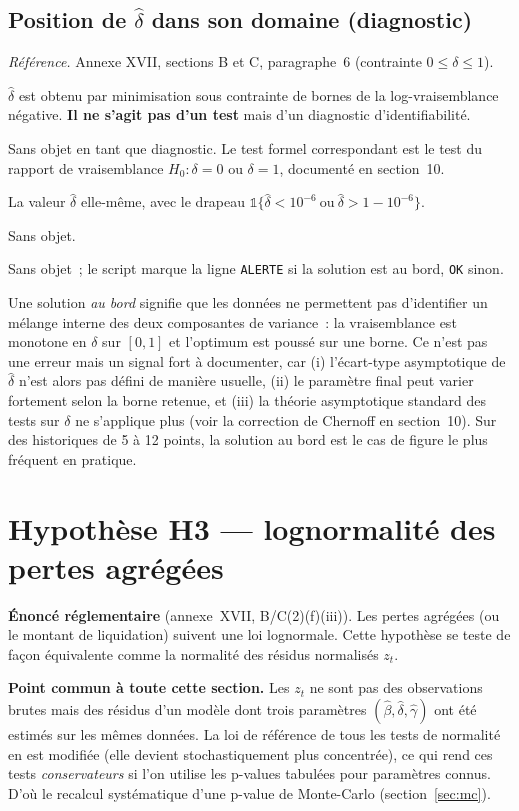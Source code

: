 \documentclass[a4paper,11pt]{article}
\newcommand{\code}[1]{\texttt{\small #1}}
\newcommand{\refl}[1]{{\small\textcolor{maincolor!70!black}{\textit{Référence.} #1}}\par\smallskip}
\newcounter{ficheid}
\newenvironment{fiche}[1]{%
  \stepcounter{ficheid}%
  \phantomsection
  \subsection{#1}%
  \label{fiche:\theficheid}%
}{%
  \end{description}\vspace{0.5em}%
}
\newcommand{\Cadre}{%
  \begin{description}[leftmargin=0pt, style=unboxed, itemsep=3pt, topsep=3pt, parsep=2pt]%
  \item[\textcolor{financeblue}{\textbf{1. Cadre, notations et hypothèses de validité (non testées).}}]}
\newcommand{\Hzero}{\item[\textcolor{financeblue}{\textbf{2. Hypothèse nulle.}}]}
\newcommand{\Stat}{\item[\textcolor{financeblue}{\textbf{3. Statistique de test.}}]}
\newcommand{\Loi}{\item[\textcolor{financeblue}{\textbf{4. Loi sous $H_0$.}}]}
\newcommand{\Pval}{\item[\textcolor{financeblue}{\textbf{5. p-value.}}]}
\newcommand{\Usage}{\item[\textcolor{financeblue}{\textbf{6. Usage et limites.}}]}
\begin{document}
\begin{fiche}{Position de $\hat\delta$ dans son domaine (diagnostic)}
\refl{Annexe XVII, sections B et C, paragraphe~6 (contrainte $0 \le \delta \le 1$).}
\Cadre
$\hat\delta$ est obtenu par minimisation sous contrainte de bornes de la log-vraisemblance
négative. \textbf{Il ne s'agit pas d'un test} mais d'un diagnostic d'identifiabilité.
\Hzero
Sans objet en tant que diagnostic. Le test formel correspondant est le test du rapport de
vraisemblance $H_0 : \delta = 0$ ou $\delta = 1$, documenté en section~10.
\Stat
La valeur $\hat\delta$ elle-même, avec le drapeau
$\mathbb{1}\{\hat\delta < 10^{-6}\ \text{ou}\ \hat\delta > 1 - 10^{-6}\}$.
\Loi
Sans objet.
\Pval
Sans objet~; le script marque la ligne \code{ALERTE} si la solution est au bord, \code{OK} sinon.
\Usage
Une solution \emph{au bord} signifie que les données ne permettent pas d'identifier un mélange
interne des deux composantes de variance~: la vraisemblance est monotone en $\delta$ sur $[0,1]$
et l'optimum est poussé sur une borne. Ce n'est pas une erreur mais un signal fort à documenter,
car (i) l'écart-type asymptotique de $\hat\delta$ n'est alors pas défini de manière usuelle,
(ii) le paramètre final peut varier fortement selon la borne retenue, et (iii) la théorie
asymptotique standard des tests sur $\delta$ ne s'applique plus (voir la correction de Chernoff
en section~10). Sur des historiques de 5 à 12 points, la solution au bord est le cas de figure le
plus fréquent en pratique.
\end{fiche}

\newpage
\clearpage
\section{Hypothèse H3 --- lognormalité des pertes agrégées}

\begin{encadre}
\textbf{Énoncé réglementaire} (annexe~XVII, B/C(2)(f)(iii)). Les pertes agrégées (ou le montant
de liquidation) suivent une loi lognormale. Cette hypothèse se teste de façon équivalente comme
la normalité des résidus normalisés $z_t$.
\end{encadre}

\begin{encadre}
\textbf{Point commun à toute cette section.} Les $z_t$ ne sont pas des observations brutes mais
des résidus d'un modèle dont trois paramètres $(\hat\beta, \hat\delta, \hat\gamma)$ ont été
estimés sur les mêmes données. La loi de référence de tous les tests de normalité en est modifiée
(elle devient stochastiquement plus concentrée), ce qui rend ces tests \emph{conservateurs} si
l'on utilise les p-values tabulées pour paramètres connus. D'où le recalcul systématique d'une
p-value de Monte-Carlo (section~\ref{sec:mc}).
\end{encadre}
\end{document}
